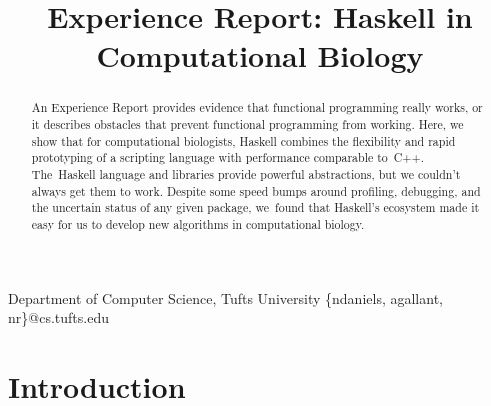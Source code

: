 \documentclass[preprint,nonatbib,blockstyle,nocopyrightspace,times]{sigplanconf}
\begin{document}
\copyrightdata{[to be supplied]} 


\title{Experience Report: Haskell in Computational Biology}


           {Department of Computer Science, Tufts University}
           {{\rmfamily\{}ndaniels, agallant, nr{\rmfamily\}}@cs.tufts.edu}


\maketitle

%
%
%
\begin{abstract}
An Experience Report provides {evidence} that functional
programming really works, or it describes obstacles that prevent
functional programming from working.   
Here, we show that for computational biologists,
Haskell combines the flexibility and rapid prototyping of a scripting
language with performance comparable to~C++.
The~Haskell language and libraries provide powerful abstractions, 
but we couldn't always get them to work.
Despite some speed bumps around profiling, debugging, and the
uncertain status of any given package, we~found that Haskell's ecosystem
made it easy for us to develop new algorithms in computational
biology.
\end{abstract}

% 
% 

\section{Introduction}
\end{document}
